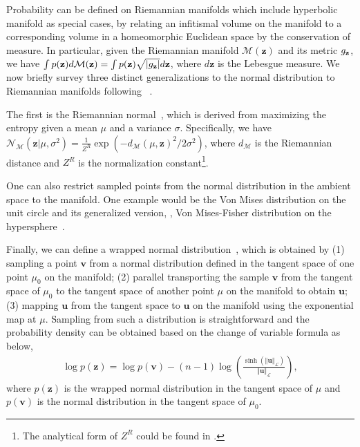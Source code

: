 

Probability can be defined on Riemannian manifolds which include hyperbolic manifold as special cases, by relating an infitismal volume on the manifold to a corresponding volume in a homeomorphic Euclidean space by the conservation of measure.
In particular, given the Riemannian manifold $\mathcal{M}(\textbf{z})$ and its metric $g_{\mathbf{z}}$, we have $\int p(\textbf{z}) d\mathcal{M} (\textbf{z}) = \int p(\textbf{z})\sqrt{|g_{\mathbf{z}}|}d \textbf{z}$, where $d \textbf{z}$ is the Lebesgue measure. We now briefly survey three distinct generalizations to the normal distribution to Riemannian manifolds following ~\cite{mathieu2019continuous,skopek2019mixed}.

The first is the Riemannian normal~\cite{said2014new}, which is derived from maximizing the entropy given a mean $\mu$ and a variance $\sigma$.
Specifically, we have $\mathcal{N}_{\mathcal{M}}(\textbf{z} \vert \mu, \sigma^{2}) = \frac{1}{Z^{R}} \exp \left( - d_{\mathcal{M}}(\mu, \textbf{z})^2 / 2 \sigma^{2} \right)$, where $d_{\mathcal{M}}$ is the Riemannian distance and $Z^{R}$ is the normalization constant\footnote{The analytical form of $Z^{R}$ could be found in \cite{said2014new,mathieu2019continuous}.}.

One can also restrict sampled points from the normal distribution in the ambient space to the manifold.
One example would be the Von Mises distribution on the unit circle and its generalized version, \ie, Von Mises-Fisher distribution on the hypersphere~\cite{davidson2018hyperspherical}.

Finally, we can define a wrapped normal distribution~\cite{nagano2019wrapped}, which is obtained by (1) sampling a point $\textbf{v}$ from a normal distribution defined in the tangent space of one point $\mu_{0}$ on the manifold; (2) parallel transporting the sample $\textbf{v}$ from the tangent space of $\mu_{0}$ to the tangent space of another point $\mu$ on the manifold to obtain $\textbf{u}$; (3) mapping $\textbf{u}$ from the tangent space to $\textbf{u}$ on the manifold using the exponential map at $\mu$.
Sampling from such a distribution is straightforward and the probability density can be obtained based on the change of variable formula as below,
\begin{align}
    \log p(\textbf{z}) = \log p(\textbf{v}) - (n-1) \log \left(\frac{\sinh{ ( \Vert \textbf{u} \Vert_{\mathcal{L}} ) }}{ \Vert \textbf{u} \Vert_{\mathcal{L}} } \right),
\end{align}
where $p(\textbf{z})$ is the wrapped normal distribution in the tangent space of $\mu$ and $p(\textbf{v})$ is the normal distribution in the tangent space of $\mu_{0}$.




